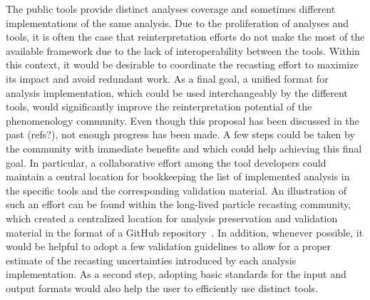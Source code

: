 \documentclass[11pt]{article}
\begin{document}
The public tools provide distinct analyses coverage and sometimes different implementations of the same analysis.
Due to the proliferation of analyses and tools, it is often the case that reinterpretation efforts do not make the most of the available framework due to the lack of interoperability between the tools.
Within this context, it would be desirable to coordinate the \gls{recasting} effort to maximize its impact and avoid redundant work. 
As a final goal, a unified format for analysis implementation, which could be used interchangeably by the different tools, would significantly improve the reinterpretation potential of the phenomenology community.
Even though this proposal has been discussed in the past (refs?), not enough progress has been made.
A few steps could be taken by the community with immediate benefits and which could help achieving this final goal.
In particular, a collaborative effort among the tool developers could maintain a central location for bookkeeping the list of implemented analysis in the specific tools and the corresponding validation material.
An illustration of such an effort can be found within the 
long-lived particle \gls{recasting} community, which created a centralized location for \gls{analysis preservation} and validation material in the format of a GitHub repository~\cite{llpRepo}.
In addition, whenever possible, it would be helpful to adopt a few validation guidelines to allow for a proper estimate of the recasting uncertainties introduced by each analysis implementation.
As a second step, adopting basic standards for the input and output formats would also help the user to efficiently use distinct tools.
\end{document}
